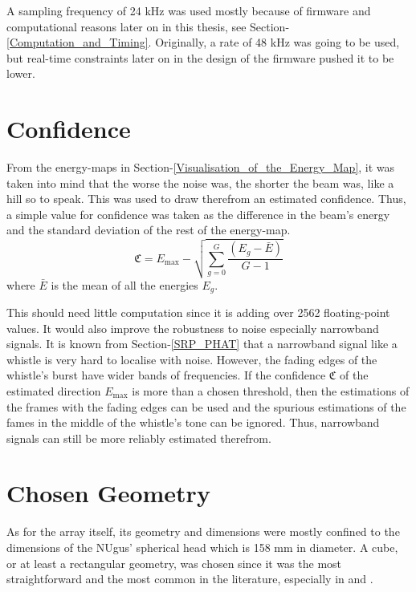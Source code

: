 \documentclass[notitlepage]{report}
\begin{document}
A sampling frequency of 24 \si{kHz} was used mostly because of firmware and computational reasons later on in this thesis, see Section-\ref{Computation_and_Timing}. Originally, a rate of 48 \si{kHz} was going to be used, but real-time constraints later on in the design of the firmware pushed it to be lower.

\section{Confidence} \label{Confidence}

From the energy-maps in Section-\ref{Visualisation_of_the_Energy_Map}, it was taken into mind that the worse the noise was, the shorter the beam was, like a hill so to speak. This was used to draw therefrom an estimated confidence. Thus, a simple value for confidence was  taken as the difference in the beam's energy and the standard deviation of the rest of the energy-map.
\begin{equation}
\mathfrak{C} = E_{\text{max}} - \sqrt{\sum_{g=0}^{G} \frac{(E_g-\bar{E})}{G-1}}
\end{equation}
where $\bar{E}$ is the mean of all the energies $E_g$.

This should need little computation since it is adding over 2562 floating-point values. It would also improve the robustness to noise especially narrowband signals. It is known from Section-\ref{SRP_PHAT} that a narrowband signal like a whistle is very hard to localise with noise. However, the fading edges of the whistle's burst have wider bands of frequencies. If the confidence $\mathfrak{C}$ of the estimated direction $E_{\text{max}}$ is more than a chosen threshold, then the estimations of the frames with the fading edges can be used and the spurious estimations of the fames in the middle of the whistle's tone can be ignored. Thus, narrowband signals can still be more reliably estimated therefrom.

\section{Chosen Geometry}

As for the array itself, its geometry and dimensions were mostly confined to the dimensions of the NUgus' spherical head which is 158 \si{mm} in diameter. A cube, or at least a rectangular geometry, was chosen since it was the most straightforward and the most common in the literature, especially in \cite{valin_localization_2004} and \cite{valin_robust_2007}.
\end{document}
